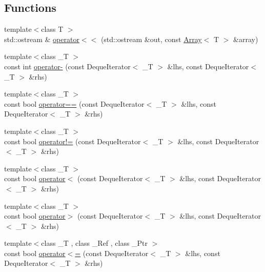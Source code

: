 \subsection*{Functions}
\begin{DoxyCompactItemize}
\item 
{\footnotesize template$<$class T $>$ }\\std\+::ostream \& \hyperlink{namespaceprism_1_1containers_a5af8912cd6946c5813074cb9e140c198}{operator$<$$<$} (std\+::ostream \&out, const \hyperlink{classprism_1_1containers_1_1_array}{Array}$<$ T $>$ \&array)
\item 
{\footnotesize template$<$class \+\_\+T $>$ }\\const int \hyperlink{namespaceprism_1_1containers_a830959d857ca44ed52f1afa2dcec4554}{operator-\/} (const Deque\+Iterator$<$ \+\_\+T $>$ \&lhs, const Deque\+Iterator$<$ \+\_\+T $>$ \&rhs)
\item 
{\footnotesize template$<$class \+\_\+T $>$ }\\const bool \hyperlink{namespaceprism_1_1containers_aac86b224a4802c7e44965e42b4dee00a}{operator==} (const Deque\+Iterator$<$ \+\_\+T $>$ \&lhs, const Deque\+Iterator$<$ \+\_\+T $>$ \&rhs)
\item 
{\footnotesize template$<$class \+\_\+T $>$ }\\const bool \hyperlink{namespaceprism_1_1containers_a5abaf172467c15dd1624c3de7c65d3c7}{operator!=} (const Deque\+Iterator$<$ \+\_\+T $>$ \&lhs, const Deque\+Iterator$<$ \+\_\+T $>$ \&rhs)
\item 
{\footnotesize template$<$class \+\_\+T $>$ }\\const bool \hyperlink{namespaceprism_1_1containers_aa0e7be99ec6ca8c3290de365093efd56}{operator$<$} (const Deque\+Iterator$<$ \+\_\+T $>$ \&lhs, const Deque\+Iterator$<$ \+\_\+T $>$ \&rhs)
\item 
{\footnotesize template$<$class \+\_\+T $>$ }\\const bool \hyperlink{namespaceprism_1_1containers_a82774d71dc461e7db2a576a14aca9b3a}{operator$>$} (const Deque\+Iterator$<$ \+\_\+T $>$ \&lhs, const Deque\+Iterator$<$ \+\_\+T $>$ \&rhs)
\item 
{\footnotesize template$<$class \+\_\+T , class \+\_\+\+Ref , class \+\_\+\+Ptr $>$ }\\const bool \hyperlink{namespaceprism_1_1containers_a3970e468aaad7eaa0f011b2b2c73bbd7}{operator$<$=} (const Deque\+Iterator$<$ \+\_\+T $>$ \&lhs, const Deque\+Iterator$<$ \+\_\+T $>$ \&rhs)
\item 

\end{DoxyCompactItemize}
